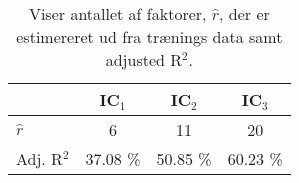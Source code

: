\begin{table}[h]
\center
\begin{tabular}{lccc}
\toprule
& IC$_1$ & IC$_2$ & IC$_3$ \\ \midrule
$\widehat{r}$ & 6 & 11 & 20 \\ 
Adj. R$^2$ & 37.08 \% & 50.85 \% & 60.23 \% \\ \bottomrule
 \end{tabular}
\caption{Viser antallet af faktorer, $\widehat{r}$, der er estimereret ud fra trænings data samt adjusted R$^2$.  } \label{tab:est_faktor}
\end{table}